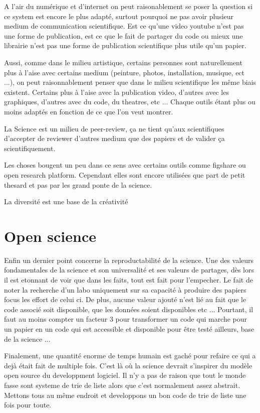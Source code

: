 A l'air du numérique et d'internet on peut raisonablement se poser la question si ce system est encore le plus adapté, surtout pourquoi ne pas avoir plusieur medium de communication scientifique. Est ce qu'une video youtube n'est pas une forme de publication, est ce que le fait de partager du code ou mieux une librairie n'est pas une forme de publication scientifique plus utile qu'un papier.

Aussi, comme dans le milieu artistique, certains personnes sont naturellement plus à l'aise avec certains medium (peinture, photos, installation, musique, ect ...), on peut raisonnablement penser que dans le milieu scientifique les même biais existent. Certains plus à l'aise avec la publication video, d'autres avec les graphiques, d'autres avec du code, du theatres,  etc ... Chaque outils étant plus ou moins adaptés en fonction de ce que l'on veut montrer.

La Science est un milieu de peer-review, ça ne tient qu'aux scientifiques d'accepter de reviewer d'autres medium que des papiers et de valider ça scientifiquement.


Les choses bougent un peu dans ce sens avec certains outils comme figshare ou open research platform. Cependant elles sont encore utilisées que part de petit thesard et pas par les grand ponte de la science.

La diversité est une base de la créativité

\section{Open science} %
Enfin un dernier point concerne la reproductabilité de la science. Une des valeurs fondamentales de la science et son universalité et ses valeurs de partages, dès lors il est etonnant de voir que dans les faits, tout est fait pour l'empecher. Le fait de noter la recherche d'un labo uniquement sur sa capacité à produire des papiers focus les effort de celui ci. De plus, aucune valeur ajouté n'est lié au fait que le code associé soit disponible, que les données soient disponibles etc ... Pourtant, il faut au moins compter un facteur 3 pour transformer un code qui marche pour un papier en un code qui est accessible et disponible pour être testé ailleurs, base de la science ...


Finalement, une quantité enorme de temps humain est gaché pour refaire ce qui a dejà était fait de multiple fois. C'est là où la science devrait s'inspirer du modèle open source du developpment logiciel. Il n'y a pas de raison que tout le monde fasse sont systeme de trie de liste alors que c'est normalement assez abstrait. Mettons tous au même endroit et developpons un bon code de trie de liste une fois pour toute.

